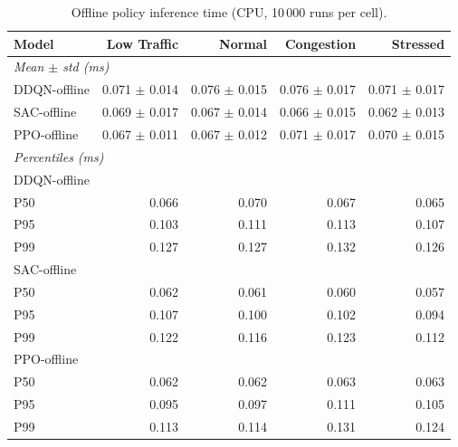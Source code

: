 \begin{table}[H]
\centering
\caption{Offline policy inference time (CPU, 10\,000 runs per cell).}
\label{tab:inference_time}
\begin{tabular}{lrrrr}
\toprule
\textbf{Model} & \textbf{Low Traffic} & \textbf{Normal} & \textbf{Congestion} & \textbf{Stressed} \\
\midrule
\multicolumn{5}{l}{\textit{Mean $\pm$ std (ms)}} \\
DDQN-offline   & 0.071 $\pm$ 0.014 & 0.076 $\pm$ 0.015 & 0.076 $\pm$ 0.017 & 0.071 $\pm$ 0.017 \\
SAC-offline    & 0.069 $\pm$ 0.017 & 0.067 $\pm$ 0.014 & 0.066 $\pm$ 0.015 & 0.062 $\pm$ 0.013 \\
PPO-offline    & 0.067 $\pm$ 0.011 & 0.067 $\pm$ 0.012 & 0.071 $\pm$ 0.017 & 0.070 $\pm$ 0.015 \\
\midrule
\multicolumn{5}{l}{\textit{Percentiles (ms)}} \\
\multicolumn{5}{l}{DDQN-offline} \\
\quad P50       & 0.066 & 0.070 & 0.067 & 0.065 \\
\quad P95       & 0.103 & 0.111 & 0.113 & 0.107 \\
\quad P99       & 0.127 & 0.127 & 0.132 & 0.126 \\
\multicolumn{5}{l}{SAC-offline} \\
\quad P50       & 0.062 & 0.061 & 0.060 & 0.057 \\
\quad P95       & 0.107 & 0.100 & 0.102 & 0.094 \\
\quad P99       & 0.122 & 0.116 & 0.123 & 0.112 \\
\multicolumn{5}{l}{PPO-offline} \\
\quad P50       & 0.062 & 0.062 & 0.063 & 0.063 \\
\quad P95       & 0.095 & 0.097 & 0.111 & 0.105 \\
\quad P99       & 0.113 & 0.114 & 0.131 & 0.124 \\
\bottomrule
\end{tabular}
\end{table}
